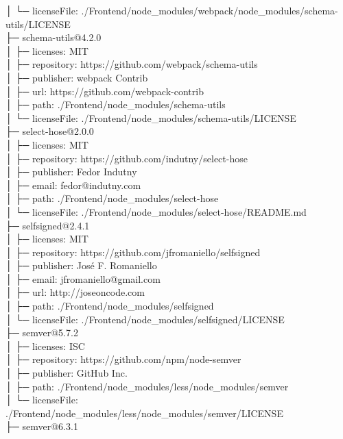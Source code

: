 \documentclass[
    paper=a4,
    twoside=false,
    parskip=half,
    listof=entryprefix,
    listof=totoc,
    index=totoc,
    bibliography=totoc,
    headsepline,
]{scrbook}
\begin{document}
    │  └─ licenseFile: ./Frontend/node\_modules/webpack/node\_modules/schema-utils/LICENSE\\
    ├─ schema-utils@4.2.0\\
    │  ├─ licenses: MIT\\
    │  ├─ repository: https://github.com/webpack/schema-utils\\
    │  ├─ publisher: webpack Contrib\\
    │  ├─ url: https://github.com/webpack-contrib\\
    │  ├─ path: ./Frontend/node\_modules/schema-utils\\
    │  └─ licenseFile: ./Frontend/node\_modules/schema-utils/LICENSE\\
    ├─ select-hose@2.0.0\\
    │  ├─ licenses: MIT\\
    │  ├─ repository: https://github.com/indutny/select-hose\\
    │  ├─ publisher: Fedor Indutny\\
    │  ├─ email: fedor@indutny.com\\
    │  ├─ path: ./Frontend/node\_modules/select-hose\\
    │  └─ licenseFile: ./Frontend/node\_modules/select-hose/README.md\\
    ├─ selfsigned@2.4.1\\
    │  ├─ licenses: MIT\\
    │  ├─ repository: https://github.com/jfromaniello/selfsigned\\
    │  ├─ publisher: José F. Romaniello\\
    │  ├─ email: jfromaniello@gmail.com\\
    │  ├─ url: http://joseoncode.com\\
    │  ├─ path: ./Frontend/node\_modules/selfsigned\\
    │  └─ licenseFile: ./Frontend/node\_modules/selfsigned/LICENSE\\
    ├─ semver@5.7.2\\
    │  ├─ licenses: ISC\\
    │  ├─ repository: https://github.com/npm/node-semver\\
    │  ├─ publisher: GitHub Inc.\\
    │  ├─ path: ./Frontend/node\_modules/less/node\_modules/semver\\
    │  └─ licenseFile: ./Frontend/node\_modules/less/node\_modules/semver/LICENSE\\
    ├─ semver@6.3.1\\
\end{document}
